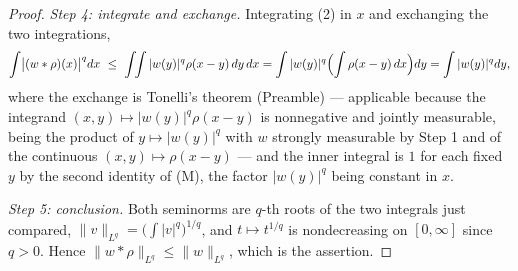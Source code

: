 \begin{proof}
\emph{Step 4: integrate and exchange.}  Integrating (2) in $x$ and exchanging
the two integrations,
\[
\int\bigl|(w*\rho)(x)\bigr|^{q}dx
\ \le\ \int\!\!\int|w(y)|^{q}\rho(x-y)\,dy\,dx
= \int|w(y)|^{q}\Bigl(\int\rho(x-y)\,dx\Bigr)dy
= \int|w(y)|^{q}dy ,
\]
where the exchange is Tonelli's theorem (Preamble) --- applicable because the
integrand $(x,y)\mapsto|w(y)|^{q}\rho(x-y)$ is nonnegative and jointly
measurable, being the product of $y\mapsto|w(y)|^{q}$ with $w$ strongly
measurable by Step 1 and of the continuous $(x,y)\mapsto\rho(x-y)$ --- and the
inner integral is $1$ for each fixed $y$ by the second identity of (M), the
factor $|w(y)|^{q}$ being constant in $x$.

\emph{Step 5: conclusion.}  Both seminorms are $q$-th roots of the two
integrals just compared, $\|v\|_{L^q}=\bigl(\int|v|^{q}\bigr)^{1/q}$, and
$t\mapsto t^{1/q}$ is nondecreasing on $[0,\infty]$ since $q>0$.  Hence
$\|w*\rho\|_{L^q}\le\|w\|_{L^q}$, which is the assertion.
\end{proof}
